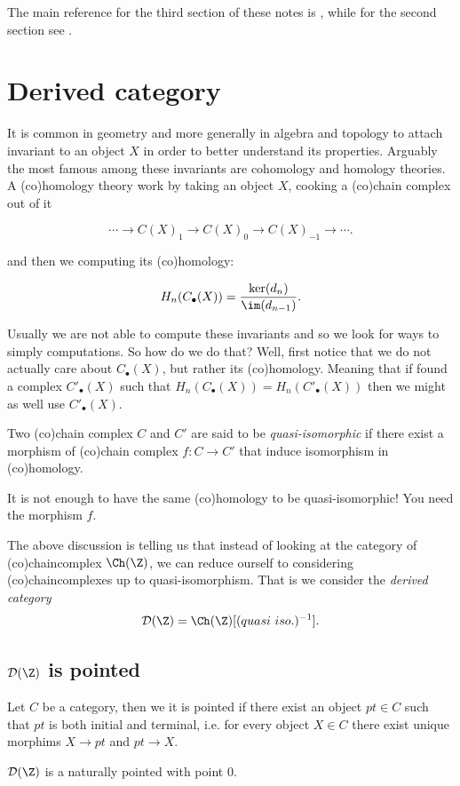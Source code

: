 The main reference for the third section of these notes is \cite[Chapter 4]{Cnossen2026StableHomotopy}, while for the second section see \cite{Weibel}.
\section{Derived category}
It is common in geometry and more generally in algebra and topology to attach invariant to an object $X$ in order to better understand its properties. Arguably the most famous among these invariants are cohomology and homology theories. A (co)homology theory work by taking an object $X$, cooking a (co)chain complex out of it

\[\cdots\to C(X)_1\to C(X)_0\to C(X)_{-1}\to\cdots.\]

and then we computing its (co)homology:

\[H_n(C_\bullet(X))=\frac{\ker(d_n)}{\im(d_{n-1})}.\]

Usually we are not able to compute these invariants and so we look for ways to simply computations. So how do we do that? Well, first notice that we do not actually care about $C_\bullet(X)$, but rather its (co)homology. Meaning that if found a complex $C'_\bullet(X)$ such that $H_n(C_\bullet(X))=H_n(C'_\bullet(X))$ then we might as well use $C'_\bullet(X)$.

\begin{definition}
    Two (co)chain complex $C$ and $C'$ are said to be \emph{quasi-isomorphic} if there exist a morphism of (co)chain complex $f:C\to C'$ that induce isomorphism in (co)homology.
\end{definition}
\begin{war}
    It is not enough to have the same (co)homology to be quasi-isomorphic! You need the morphism $f$.
\end{war}
The above discussion is telling us that instead of looking at the category of (co)chaincomplex $\Ch(\Z)$, we can reduce ourself to considering (co)chaincomplexes up to quasi-isomorphism. That is we consider the \emph{derived category}
\[\mathcal{D}(\Z)=\Ch(\Z)[(quasi \  iso.)^{-1}].\]
\subsection{$\mathcal{D(\Z)}$ is pointed}
\begin{definition}
    Let $C$ be a category, then we it is pointed if there exist an object $pt\in C$ such that $pt$ is both initial and terminal, i.e. for every object $X\in C$ there exist unique morphims  $X\to pt$ and $pt\to X$.
\end{definition}
\begin{proposition}
    $\mathcal{D(\Z)}$ is a naturally pointed with point $0$.
\end{proposition}
